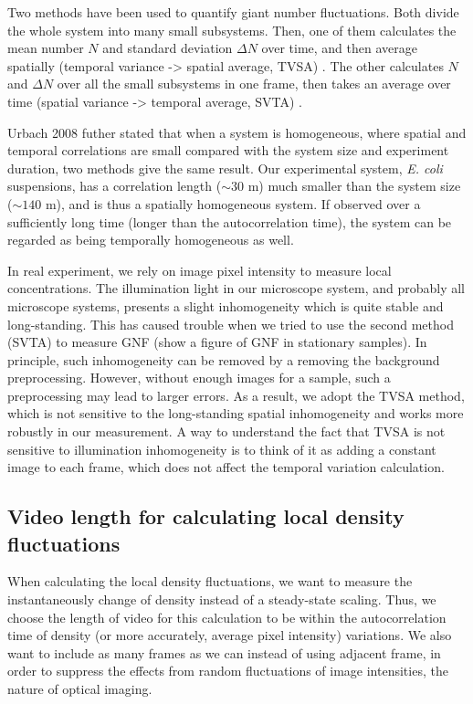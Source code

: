 \documentclass[preprint,aps,prl,amsmath,amssymb,longbibliography]{revtex4-2}
\begin{document}
Two methods have been used to quantify giant number fluctuations. Both divide the whole system into many small subsystems. Then, one of them calculates the mean number $N$ and standard deviation $\Delta N$ over time, and then average spatially (temporal variance -> spatial average, TVSA) \cite{Narayan2007}. The other calculates $N$ and $\Delta N$ over all the small subsystems in one frame, then takes an average over time (spatial variance -> temporal average, SVTA) \cite{Aranson2008}.

Urbach 2008 futher stated that when a system is homogeneous, where spatial and temporal correlations are small compared with the system size and experiment duration, two methods give the same result. Our experimental system, \textit{E. coli} suspensions, has a correlation length ($\sim 30$ \textmu m) much smaller than the system size ($\sim 140$ \textmu m), and is thus a spatially homogeneous system. If observed over a sufficiently long time (longer than the autocorrelation time), the system can be regarded as being temporally homogeneous as well.

In real experiment, we rely on image pixel intensity to measure local concentrations. The illumination light in our microscope system, and probably all microscope systems, presents a slight inhomogeneity which is quite stable and long-standing. This has caused trouble when we tried to use the second method (SVTA) to measure GNF (show a figure of GNF in stationary samples). In principle, such inhomogeneity can be removed by a removing the background preprocessing. However, without enough images for a sample, such a preprocessing may lead to larger errors. As a result, we adopt the TVSA method, which is not sensitive to the long-standing spatial inhomogeneity and works more robustly in our measurement. A way to understand the fact that TVSA is not sensitive to illumination inhomogeneity is to think of it as adding a constant image to each frame, which does not affect the temporal variation calculation.



\subsection{Video length for calculating local density fluctuations}
When calculating the local density fluctuations, we want to measure the instantaneously change of density instead of a steady-state scaling. Thus, we choose the length of video for this calculation to be within the autocorrelation time of density (or more accurately, average pixel intensity) variations. We also want to include as many frames as we can instead of using adjacent frame, in order to suppress the effects from random fluctuations of image intensities, the nature of optical imaging.
\end{document}
